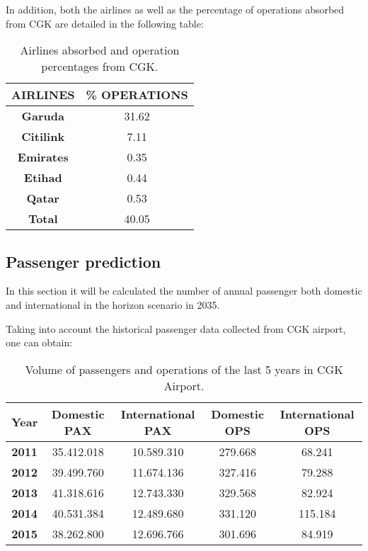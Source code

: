 In addition, both the airlines as well as the percentage of operations absorbed from CGK are detailed in the following table:

	\begin{table}[ht!]
	\label{table:AirlinesAbsorbed}
	\centering
	\begin{tabular}{|c|c|}
		\hline
		\textbf{AIRLINES} & \textbf{\% OPERATIONS}\\
		\hline
		\textbf{Garuda} & 31.62\\
		\hline
		\textbf{Citilink} & 7.11\\
		\hline
		\textbf{Emirates} & 0.35\\
		\hline
		\textbf{Etihad} & 0.44\\
		\hline
		\textbf{Qatar} & 0.53\\
		\hline
		\textbf{Total} & 40.05\\
		\hline
	\end{tabular}
	\caption{Airlines absorbed and operation percentages from CGK.}
	\end{table}

	\subsection{Passenger prediction}
In this section it will be calculated the number of annual passenger both domestic and international in the horizon scenario in 2035.
 
Taking into account the historical passenger data collected from CGK airport, one can obtain:

\begin{table}[ht!]
	\label{table:PAXOPSCGK}
	\centering
	\begin{tabular}{|c|c|c|c|c|}
		\hline 
		\textbf{Year} & \textbf{Domestic PAX} & \textbf{International PAX} & \textbf{Domestic OPS} & \textbf{International OPS}\tabularnewline
		\hline 
		\hline 
		\textbf{2011} & 35.412.018 & 10.589.310 & 279.668  & 68.241 \tabularnewline
		\hline 
		\textbf{2012} & 39.499.760  & 11.674.136  & 327.416  & 79.288 \tabularnewline
		\hline 
		\textbf{2013} & 41.318.616  & 12.743.330  & 329.568  & 82.924 \tabularnewline
		\hline 
		\textbf{2014} & 40.531.384  & 12.489.680  & 331.120  & 115.184 \tabularnewline
		\hline 
		\textbf{2015} & 38.262.800  & 12.696.766  & 301.696  & 84.919 \tabularnewline
		\hline 
	\end{tabular}
	
	\caption{Volume of passengers and operations of the last 5 years in CGK Airport.}
\end{table}

